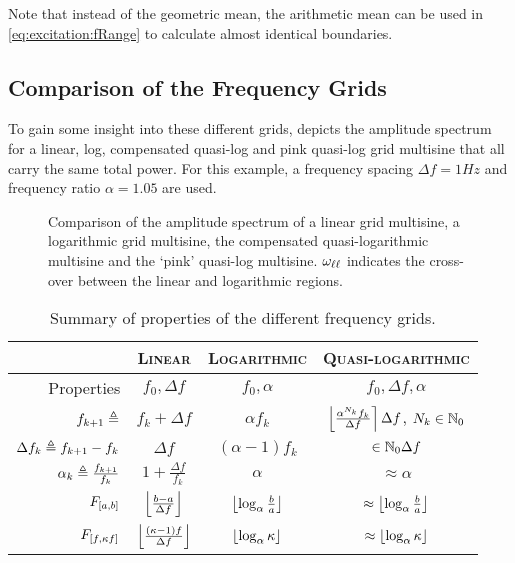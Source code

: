   Note that instead of the geometric mean, the arithmetic mean can be used in \eqref{eq:excitation:fRange} to calculate almost identical boundaries.

  \subsection{Comparison of the Frequency Grids}
  To gain some insight into these different grids,  depicts the amplitude spectrum for a linear, log, compensated quasi-log and pink quasi-log grid multisine that all carry the same total power.
  For this example, a frequency spacing $\Delta f = 1\unit{Hz}$ and frequency ratio $\alpha = 1.05$ are used.
  
  \begin{figure}[ht]
    \centering
      \setlength{}
      \setlength\figureheight{0.5\figurewidth}
    
    \caption[Amplitude spectrum for linear, logarithmic, quasi-logarithmic grids.]{Comparison of the amplitude spectrum of a linear grid multisine, a logarithmic grid multisine, the compensated quasi-logarithmic multisine and the `pink' quasi-log multisine.
    $\omega_{\ell \ell}$ indicates the cross-over between the linear and logarithmic regions. }%
    \label{fig:excitation:freqGrids}
  \end{figure}

  \begin{table}
  \centering
   \caption{Summary of  properties of the different frequency grids.}
   \label{tbl:excitation:gridProperties}
    \begin{tabular}{rccc} 
    \toprule
     & \textsc{Linear} & \textsc{Logarithmic} & \textsc{Quasi-logarithmic} \\
    \midrule
    Properties 
       & $f_0, \Delta f$ 
       & $f_0, \alpha$ 
       & $f_0, \Delta f, \alpha$\\
    \midrule
    $f_{k+1} \triangleq$ 
       & $f_{k} + \Delta f$ 
       & $\alpha f_{k}$
       & $\left\lfloor \frac{\alpha^{N_k} f_k}{\Delta f} \right\rceil \Delta f$,   $N_k \in \mathbb{N}_{0}$
       \\[5pt]
    $\Delta f_k \triangleq f_{k+1} - f_k$ 
       & $\Delta f$
       & $(\alpha - 1) f_k$
       & $ \in \mathbb{N}_{0} \Delta f$ \\[5pt]
    $\alpha_k \triangleq \frac{f_{k+1}}{f_k}$ 
       & $1 + \frac{\Delta f}{f_k}$ 
       & $\alpha$ 
       & $\approx \alpha $ \\[5pt]
    $F_{\left[ a,b \right]}$
       & $\left\lfloor \frac{b - a}{\Delta f} \right\rfloor$
       & $\left\lfloor \log_{\alpha} \frac{b}{a} \right\rfloor$
       & $\approx \left\lfloor \log_{\alpha} \frac{b}{a} \right\rfloor$\\[5pt]
    $F_{\left[ f, \kappa f \right]}$
      & $\left\lfloor \frac{(\kappa - 1)f}{\Delta f} \right\rfloor$
      & $\left\lfloor \log_{\alpha} \kappa \right\rfloor$
      & $\approx \left\lfloor \log_{\alpha} \kappa \right\rfloor$\\[5pt]
    \bottomrule
    \end{tabular}
  \end{table}


